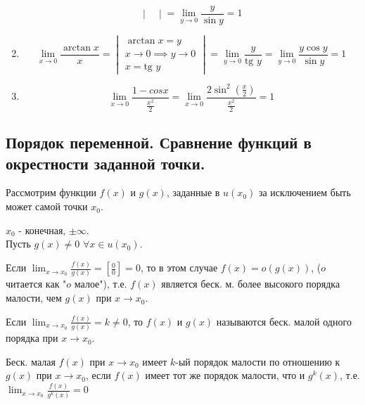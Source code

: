 \documentclass[12pt]{article}
\begin{document}
\begin{adjustwidth}{1.5em}{1.5em}
\begin{enumerate}
\[\begin{vmatrix}
            \end{vmatrix} = \lim_{y\to 0}\frac{y}{\sin y} = 1\]
            \item \[\lim_{x\to 0}\frac{\arctan x}{x} = \begin{vmatrix}
                \arctan x = y\\
                x \to 0 \implies y \to 0\\
                x = \text{tg } y
            \end{vmatrix} = \lim_{y\to 0}\frac{y}{\text{tg } y} = \lim_{y\to 0}\frac{y\cos y}{\sin y} = 1\]
            \item \[\lim_{x\to 0}\frac{1-cos x}{\frac{x^2}{2}} = \lim_{x\to 0}\frac{2\sin^2(\frac{x}{2})}{\frac{x^2}{2}} = 1\]
        \end{enumerate}
    \end{adjustwidth}

    \subsection{Порядок переменной. Сравнение функций в окрестности заданной точки.}
    \noindent Рассмотрим функции $f(x)$ и $g(x)$, заданные в $u(x_0)$ за исключением быть может самой точки $x_0$.\par\noindent
    $x_0$ - конечная, $\pm \infty$.\\
    Пусть $g(x) \ne 0$ $\forall x \in u(x_0)$.\par\noindent
    Если $\lim_{x\to x_0}\frac{f(x)}{g(x)} = \left[ \frac{0}{0} \right] = 0$, то в этом случае $f(x) = o(g(x))$, ($o$ читается как "$o$ малое"), т.е. $f(x)$ является беск. м. более высокого порядка малости, чем $g(x)$ при $x \to x_0$.\par\noindent
    Если $\lim_{x\to x_0}\frac{f(x)}{g(x)} = k \ne 0$, то $f(x)$ и $g(x)$ называются беск. малой одного порядка при $x \to x_0$.\par\noindent
    Беск. малая $f(x)$ при $x \to x_0$ имеет $k$-ый порядок малости по отношению к $g(x)$ при $x \to x_0$, если $f(x)$ имеет тот же порядок малости, что и $g^k(x)$, т.е. $\lim_{x\to x_0}\frac{f(x)}{g^k(x)} = 0$
    
\end{document}
